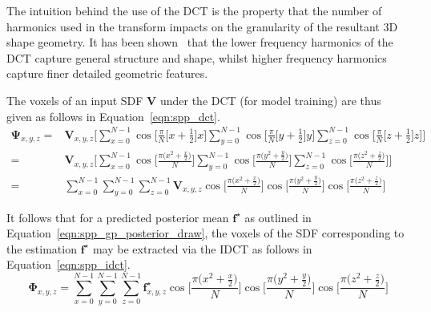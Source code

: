 The intuition behind the use of the DCT is the property that the number of harmonics used 
in the transform impacts on the granularity of the resultant 3D shape geometry. It has been 
shown~\cite{Ren2014} that the lower frequency harmonics of the DCT capture general structure 
and shape, whilst higher frequency harmonics capture finer detailed geometric features.

The voxels of an input SDF \( \bm{V} \) under the DCT (for model training) are thus given 
as follows in Equation~\ref{eqn:spp_dct}.
\begin{align}
  \label{eqn:spp_dct}
  \bm{\Psi}_{x, y, z} ={}& \bm{V}_{x, y, z} \Bigg[
  \sum_{x=0}^{N-1} \cos \Big[ \frac{\pi}{N} \big[ x + \frac{1}{2} \big] x \Big]
  \sum_{y=0}^{N-1} \cos \Big[ \frac{\pi}{N} \big[ y + \frac{1}{2} \big] y \Big]
  \sum_{z=0}^{N-1} \cos \Big[ \frac{\pi}{N} \big[ z + \frac{1}{2} \big] z \Big] \Bigg]\\
  ={}& \bm{V}_{x, y, z} \Bigg[
  \sum_{x=0}^{N-1} \cos \Big[ \frac{\pi \big( x^{2} + \frac{x}{2} \big)}{N} \Big]
  \sum_{y=0}^{N-1} \cos \Big[ \frac{\pi \big( y^{2} + \frac{y}{2} \big)}{N} \Big]
  \sum_{z=0}^{N-1} \cos \Big[ \frac{\pi \big( z^{2} + \frac{z}{2} \big)}{N} \Big] \Bigg]\\
  ={}& \sum_{x=0}^{N-1} \sum_{y=0}^{N-1} \sum_{z=0}^{N-1} \bm{V}_{x, y, z}
  \cos \Big[ \frac{\pi \big( x^{2} + \frac{x}{2} \big)}{N} \Big]
  \cos \Big[ \frac{\pi \big( y^{2} + \frac{y}{2} \big)}{N} \Big]
  \cos \Big[ \frac{\pi \big( z^{2} + \frac{z}{2} \big)}{N} \Big]
\end{align}

It follows that for a predicted posterior mean \( \bm{f}^{\star} \) as outlined in 
Equation~\ref{eqn:spp_gp_posterior_draw}, the voxels of the SDF corresponding to the 
estimation \( \bm{f}^{\star} \) may be extracted via the IDCT as follows in 
Equation~\ref{eqn:spp_idct}.
\begin{equation}
  \label{eqn:spp_idct}
  \bm{\Phi}_{x, y, z} = \sum_{x=0}^{N-1} \sum_{y=0}^{N-1} \sum_{z=0}^{N-1} 
  \bm{f}^{\star}_{x, y, z}
  \cos \Big[ \frac{\pi \big( x^{2} + \frac{x}{2} \big)}{N} \Big]
  \cos \Big[ \frac{\pi \big( y^{2} + \frac{y}{2} \big)}{N} \Big]
  \cos \Big[ \frac{\pi \big( z^{2} + \frac{z}{2} \big)}{N} \Big]
\end{equation}

